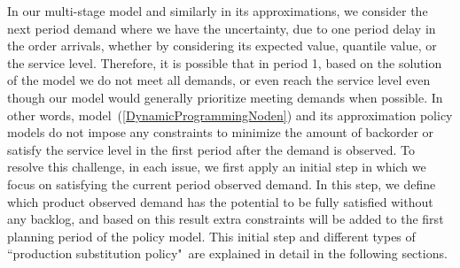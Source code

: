 \documentclass[11pt]{article}
\newcommand{\PSpolicy}{``production substitution policy"}
\begin{document}
In our multi-stage model and similarly in its approximations, we consider the next period demand where we have the uncertainty, due to one period delay in the order arrivals, whether by considering its expected value, quantile value, or the service level.  Therefore, it is possible that in period 1, based on the solution of the model we do not meet all demands, or even reach the service level even though our model would generally prioritize meeting demands when possible.  
In other words, model~(\ref{DynamicProgrammingNoden}) and its approximation policy models do not impose any constraints to minimize the amount of backorder or satisfy the service level in the first period after the demand is observed. 
To resolve this challenge, in each issue, we first apply an initial step in which we focus on satisfying the current period observed demand. 
In this step, we  define which product observed demand has the potential to be fully satisfied without any backlog, and based on this result extra constraints will be added to the first planning period of the policy model. 
This initial step and different types of \PSpolicy \ are explained in detail in the following sections. 
\end{document}
